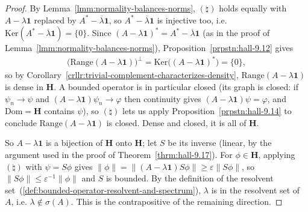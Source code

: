 \begin{proof}
By Lemma~\ref{lmm:normality-balances-norms}, $(\natural)$ holds equally with $A - \lambda\mathbf{1}$ replaced by $A^* - \overline\lambda\mathbf{1}$, so $A^* - \overline\lambda\mathbf{1}$ is injective too, i.e. $\text{Ker}(A^* - \overline\lambda\mathbf{1}) = \{0\}$. Since $(A-\lambda\mathbf{1})^* = A^* - \overline\lambda\mathbf{1}$ (as in the proof of Lemma~\ref{lmm:normality-balances-norms}), Proposition~\ref{prpstn:hall-9.12} gives
\begin{align}
    \big( \text{Range}(A - \lambda\mathbf{1}) \big)^\perp = \text{Ker}\big( (A-\lambda\mathbf{1})^* \big) = \{0\},
\end{align}
so by Corollary~\ref{crllr:trivial-complement-characterizes-density}, $\text{Range}(A-\lambda\mathbf{1})$ is dense in $\mathbf{H}$. A bounded operator is in particular closed (its graph is closed: if $\psi_n\to\psi$ and $(A-\lambda\mathbf{1})\psi_n \to \varphi$ then continuity gives $(A-\lambda\mathbf{1})\psi = \varphi$, and $\text{Dom} = \mathbf{H}$ contains $\psi$), so $(\natural)$ lets us apply Proposition~\ref{prpstn:hall-9.14} to conclude $\text{Range}(A-\lambda\mathbf{1})$ is closed. Dense and closed, it is all of $\mathbf{H}$.

So $A - \lambda\mathbf{1}$ is a bijection of $\mathbf{H}$ onto $\mathbf{H}$; let $S$ be its inverse (linear, by the argument used in the proof of Theorem~\ref{thrm:hall-9.17}). For $\phi \in \mathbf{H}$, applying $(\natural)$ with $\psi = S\phi$ gives $\left\| \phi \right\| = \left\| (A-\lambda\mathbf{1})S\phi \right\| \ge \varepsilon\left\| S\phi \right\|$, so $\left\| S\phi \right\| \le \varepsilon^{-1}\left\| \phi \right\|$ and $S$ is bounded. By the definition of the resolvent set~(\ref{def:bounded-operator-resolvent-and-spectrum}), $\lambda$ is in the resolvent set of $A$, i.e. $\lambda \notin \sigma(A)$. This is the contrapositive of the remaining direction.
\end{proof}

